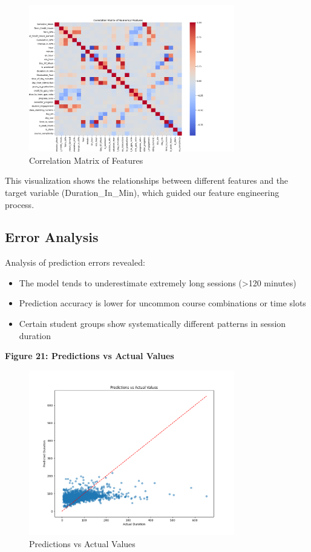 \documentclass[12pt,letterpaper]{article}
\begin{document}
\begin{figure}[H]
    \centering
    \includegraphics[width=0.8\textwidth]{duration_prediction/visualizations/correlation_matrix.png}
    \caption{Correlation Matrix of Features}
\end{figure}

This visualization shows the relationships between different features and the target variable (Duration\_In\_Min), which guided our feature engineering process.

\subsection{Error Analysis}

Analysis of prediction errors revealed:

\begin{itemize}
    \item The model tends to underestimate extremely long sessions (>120 minutes)
    \item Prediction accuracy is lower for uncommon course combinations or time slots
    \item Certain student groups show systematically different patterns in session duration
\end{itemize}

\textbf{Figure 21: Predictions vs Actual Values}

\begin{figure}[H]
    \centering
    \includegraphics[width=0.8\textwidth]{duration_prediction/visualizations/predictions_vs_actual.png}
    \caption{Predictions vs Actual Values}
\end{figure}
\end{document}
